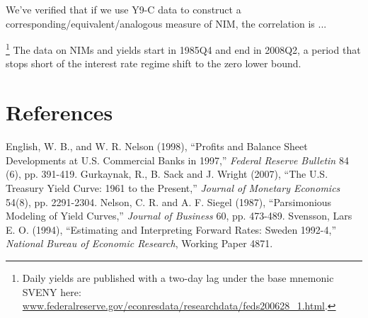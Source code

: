 \documentclass[12pt]{article}
\begin{document}
We've verified that if we use Y9-C data to construct a corresponding/equivalent/analogous measure of NIM, the correlation is ...


 \footnote{Daily yields are published with a two-day lag under the base mnemonic SVENY here: \url{www.federalreserve.gov/econresdata/researchdata/feds200628_1.html}.} \newline \newline
The data on NIMs and yields start in 1985Q4 and end in 2008Q2, a period that stops short of the interest rate regime shift to the zero lower bound.

\section{References}

English, W. B., and W. R. Nelson (1998), ``Profits and Balance Sheet Developments at U.S. Commercial Banks in 1997,'' \textit{Federal Reserve Bulletin} 84 (6), pp. 391-419. \newline  
Gurkaynak, R., B. Sack and J. Wright (2007), ``The U.S. Treasury Yield Curve: 1961 to the Present,'' \textit{Journal of Monetary Economics} 54(8), pp. 2291-2304. \newline
Nelson, C. R. and A. F. Siegel (1987), ``Parsimonious Modeling of Yield Curves,'' \textit{Journal of Business} 60, pp. 473-489. \newline
Svensson, Lars E. O. (1994), ``Estimating and Interpreting Forward Rates: Sweden 1992-4,'' \textit{National Bureau of Economic Research}, Working Paper 4871.
\end{document}
